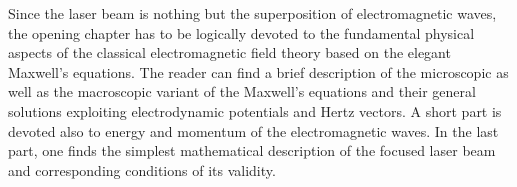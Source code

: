 Since the laser beam is nothing but the superposition of electromagnetic waves, the opening chapter has to be logically devoted to the fundamental physical aspects of the classical electromagnetic field theory based on the elegant Maxwell's equations. The reader can find a brief description of the microscopic as well as the macroscopic variant of the Maxwell's equations and their general solutions exploiting electrodynamic potentials and Hertz vectors. A short part is devoted also to energy and momentum of the electromagnetic waves. In the last part, one finds the simplest mathematical description of the focused laser beam and corresponding conditions of its validity.